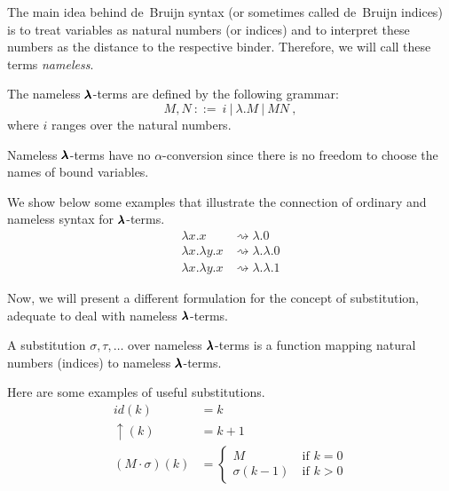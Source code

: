 The main idea behind de~Bruijn syntax (or sometimes called de~Bruijn indices) is to treat variables as natural numbers (or indices) and to interpret these numbers as the distance to the respective binder.
Therefore, we will call these terms \textit{nameless}. 

\begin{definition}
  The nameless $\pmb{\lambda}$-terms are defined by the following grammar:
  \[ M, N \ ::= \ i \ | \ \lambda . M \ | \ M N \ , \]  
  where $i$ ranges over the natural numbers.
\end{definition}

\begin{remark}
  Nameless $\pmb{\lambda}$-terms have no $\alpha$-conversion since there is no freedom to choose the names of bound variables.
\end{remark}

We show below some examples that illustrate the connection of ordinary and nameless syntax for $\pmb{\lambda}$-terms.
\begin{align*}
  \lambda x . x &\rightsquigarrow \lambda . 0 \\
  \lambda x . \lambda y . x &\rightsquigarrow \lambda . \lambda . 0 \\
  \lambda x . \lambda y . x &\rightsquigarrow \lambda . \lambda . 1
\end{align*}

Now, we will present a different formulation for the concept of substitution, adequate to deal with nameless $\pmb{\lambda}$-terms.
\begin{definition}[Substitution]
  A substitution $\sigma, \tau, \dots$ over nameless $\pmb{\lambda}$-terms is a function mapping natural numbers (indices) to nameless $\pmb{\lambda}$-terms.
\end{definition}

Here are some examples of useful substitutions.
\begin{align*}
  id(k) &= k \\
  \uparrow(k) &= k+1 \\
  (M \cdot \sigma)(k) &=
                        \begin{cases}
                          M & \ \text{if $k = 0$} \\
                          \sigma(k-1) & \ \text{if $k > 0$}
                        \end{cases}
\end{align*}

